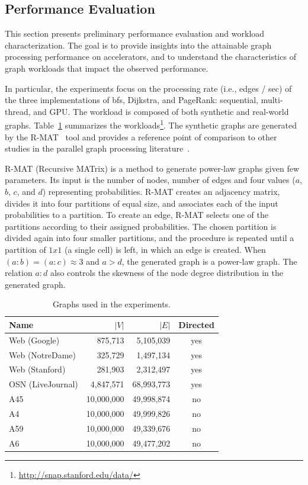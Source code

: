 \subsection{Performance Evaluation}
\label{sec:evaluation}

This section presents preliminary performance evaluation and workload characterization. The goal is to provide insights into the attainable graph processing performance on accelerators, and to understand the characteristics of graph workloads that impact the observed performance. 

In particular, the experiments focus on the processing rate (i.e., edges / sec) of the three implementations of {\sc bfs}, Dijkstra, and PageRank: sequential, multi-thread, and GPU. The workload is composed of both synthetic and real-world graphs. Table~\ref{tab:workload} summarizes the workloads\footnote{\url{http://snap.stanford.edu/data/}}. The synthetic graphs are generated by the R-MAT~\cite{rmat} tool and provides a reference point of comparison to other studies in the parallel graph processing literature~\cite{agarwal2010scalable}.

R-MAT (Recursive MATrix) \cite{rmat} is a method to generate power-law graphs given few parameters. Its input is the number of nodes, number of edges and four values ($a$, $b$, $c$, and $d$) representing probabilities. R-MAT creates an adjacency matrix, divides it into four partitions of equal size, and associates each of the input probabilities to a partition. To create an edge, R-MAT selects one of the partitions according to their assigned probabilities. The chosen partition is divided again into four smaller partitions, and the procedure is repeated until a partition of $1 x 1$ (a single cell) is left, in which an edge is created. When $(a : b) = (a : c) \approx 3$ and $a > d$, the generated graph is a power-law graph. The relation $a : d$ also controls the skewness of the node degree distribution in the generated graph.

\begin{table}[ht]
\centering
\begin{tabular}{l|r|r|c}
Name              & $|V|$   & $|E|$      & Directed \\\hline
Web (Google)      & 875,713 & 5,105,039  & yes      \\\hline
Web (NotreDame)   & 325,729 & 1,497,134  & yes      \\\hline
Web (Stanford)    & 281,903 & 2,312,497  & yes      \\\hline
OSN (LiveJournal) & 4,847,571 & 68,993,773 & yes    \\\hline
A45         & 10,000,000 & 49,998,874 & no \\\hline
A4          & 10,000,000 & 49,999,826 & no \\\hline
A59         & 10,000,000 & 49,339,676 & no \\\hline
A6          & 10,000,000 & 49,477,202 & no \\\hline
\end{tabular}
\caption{Graphs used in the experiments.}
\label{tab:workload}
\end{table}

